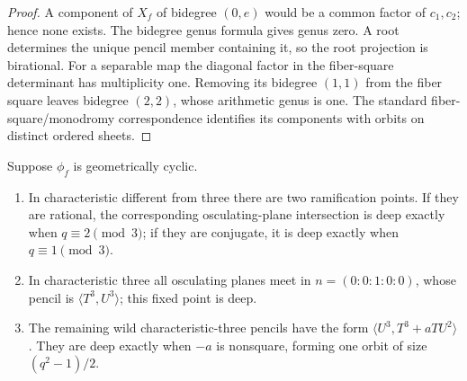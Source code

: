 \begin{proof}
A component of $X_f$ of bidegree $(0,e)$ would be a common factor of
$c_1,c_2$; hence none exists.  The bidegree genus formula gives genus
zero.  A root determines the unique pencil member containing it, so the
root projection is birational.  For a separable map the diagonal factor
in the fiber-square determinant has multiplicity one.  Removing its
bidegree $(1,1)$ from the fiber square leaves bidegree $(2,2)$, whose
arithmetic genus is one.  The standard fiber-square/monodromy
correspondence identifies its components with orbits on distinct
ordered sheets.
\end{proof}

\begin{lemma}\label{lem:cyclic}%
%
Suppose $\phi_f$ is geometrically cyclic.
\begin{enumerate}[label=\textup{(\roman*)}]
\item In characteristic different from three there are two ramification
      points.  If they are rational, the corresponding osculating-plane
      intersection is deep exactly when $q\equiv2\pmod3$; if they are
      conjugate, it is deep exactly when $q\equiv1\pmod3$.
\item In characteristic three all osculating planes meet in
      $n=(0:0:1:0:0)$, whose pencil is
      $\langle T^3,U^3\rangle$; this fixed point is deep.
\item The remaining wild characteristic-three pencils have the form
      $\langle U^3,T^3+aTU^2\rangle$.  They are deep exactly when $-a$
      is nonsquare, forming one orbit of size $(q^2-1)/2$.
\end{enumerate}
\end{lemma}

